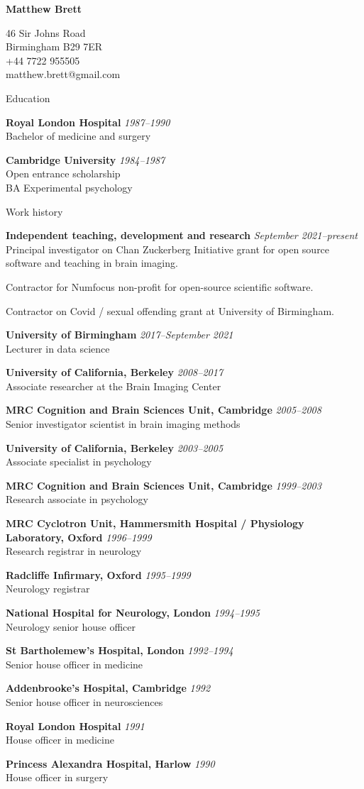 \documentclass{cv}
\newcommand{\PlaceDate}[2]{{\bf #1} \hfill {\em #2} \\}
\newcommand{\PlaceDateNote}[3]{{\bf #1} \hfill {\em #2} \\#3}
\newcommand{\UoB}{University of Birmingham}
\newcommand{\UCB}{University of California, Berkeley}
\newcommand{\CBU}{MRC Cognition and Brain Sciences Unit, Cambridge}
\begin{document}
\nocite{*}

{\huge \bf Matthew Brett}

46 Sir Johns Road \\
Birmingham B29 7ER \\
+44 7722 955505 \\
matthew.brett@gmail.com

\begin{cvSection}{Education}

\PlaceDate{Royal London Hospital}{1987--1990 }
Bachelor of medicine and surgery

\PlaceDateNote{Cambridge University}{1984--1987 }{
Open entrance scholarship \\
BA Experimental psychology}

\end{cvSection}

\begin{cvSection}{Work history}

\PlaceDateNote{Independent teaching, development and research}{September 2021--present}{
    Principal investigator on Chan Zuckerberg Initiative grant for open source software and teaching in brain imaging.

    Contractor for Numfocus non-profit for open-source scientific software.

    Contractor on Covid / sexual offending grant at \UoB.}

\PlaceDateNote{\UoB}{2017--September 2021 }{
    Lecturer in data science}

\PlaceDateNote{\UCB}{2008--2017 }{
    Associate researcher at the Brain Imaging Center}

\PlaceDateNote{\CBU}{2005--2008}{
    Senior investigator scientist in brain imaging methods}

\PlaceDateNote{\UCB}{2003--2005 }{
    Associate specialist in psychology}

\PlaceDateNote{\CBU}{1999--2003 }{
    Research associate in psychology}

\PlaceDateNote{
MRC Cyclotron Unit, Hammersmith Hospital / Physiology Laboratory, Oxford}
{1996--1999}
{Research registrar in neurology}

\PlaceDateNote{Radcliffe Infirmary, Oxford}
{1995--1999}
{Neurology registrar}

\PlaceDateNote{National Hospital for Neurology, London}{1994--1995 }{
Neurology senior house officer}

\PlaceDateNote{St Bartholemew's Hospital, London}{1992--1994 }{
Senior house officer in medicine}

\PlaceDateNote{Addenbrooke's Hospital, Cambridge}{1992 }{
Senior house officer in neurosciences}

\PlaceDateNote{Royal London Hospital}{1991 }{
House officer in medicine}

\PlaceDateNote{Princess Alexandra Hospital, Harlow}{1990 }{
House officer in surgery}

\end{cvSection}
\end{document}
